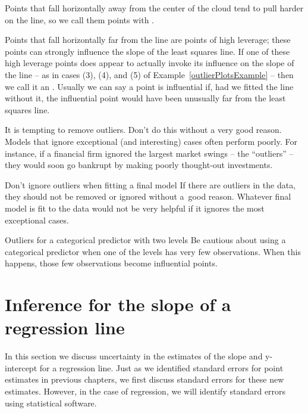  \begin{termBox}{
Points that fall horizontally away from the center of the cloud tend to pull harder on the line, so we call them points with .}
\end{termBox}

Points that fall horizontally far from the line are points of high leverage; these points can strongly influence the slope of the least squares line. If one of these high leverage points does appear to actually invoke its influence on the slope of the line -- as in cases (3), (4), and (5) of Example~\ref{outlierPlotsExample} -- then we call it an . Usually we can say a point is influential if, had we fitted the line without it, the influential point would have been unusually far from the least squares line.

It is tempting to remove outliers. Don't do this without a very good reason. Models that ignore exceptional (and interesting) cases often perform poorly. For instance, if a financial firm ignored the largest market swings -- the ``outliers'' --  they would soon go bankrupt by making poorly thought-out investments.

\begin{caution}{Don't ignore outliers when fitting a final model}
{If there are outliers in the data, they should not be removed or ignored without a~good reason. Whatever final model is fit to the data would not be very helpful if it ignores the most exceptional cases.}
\end{caution}

\begin{caution}{Outliers for a categorical predictor with two levels}
{Be cautious about using a categorical predictor when one of the levels has very few observations. When this happens, those few observations become influential points.}
\end{caution}


\section[Inference for the slope of a regression line]{Inference for the slope of a regression line }
\label{inferenceForLinearRegression}

In this section we discuss uncertainty in the estimates of the slope and y-intercept for a regression line. Just as we identified standard errors for point estimates in previous chapters, we first discuss standard errors for these new estimates. However, in the case of regression, we will identify standard errors using statistical software.

